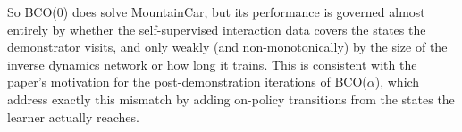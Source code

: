 \documentclass[12pt]{article}%
\begin{document}
So BCO(0) does solve MountainCar, but its performance is governed almost entirely by whether
the self-supervised interaction data covers the states the demonstrator visits, and only
weakly (and non-monotonically) by the size of the inverse dynamics network or how long it
trains. This is consistent with the paper's motivation for the post-demonstration iterations
of BCO($\alpha$), which address exactly this mismatch by adding on-policy transitions from
the states the learner actually reaches.
\end{document}
